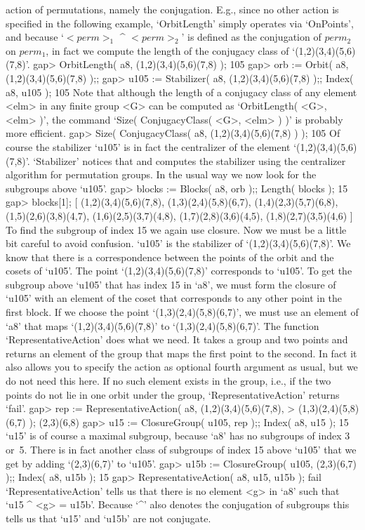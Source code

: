 action of permutations, namely the  conjugation.
E.g., since no  other action is specified  in the  following example,
`OrbitLength' simply operates via `OnPoints',
and because `$<perm>_1$ ^ $<perm>_2$' is defined as the conjugation
of $perm_2$ on $perm_1$, in fact we compute the length of
the conjugacy class of `(1,2)(3,4)(5,6)(7,8)'.
\beginexample
gap> OrbitLength( a8, (1,2)(3,4)(5,6)(7,8) );
105
gap> orb := Orbit( a8, (1,2)(3,4)(5,6)(7,8) );;
gap> u105 := Stabilizer( a8, (1,2)(3,4)(5,6)(7,8) );; Index( a8, u105 );
105 
\endexample
Note that although the length of a conjugacy class of any element <elm>
in any finite group <G> can be computed as `OrbitLength( <G>, <elm> )',
the command `Size( ConjugacyClass( <G>, <elm> ) )' is probably more
efficient.
\beginexample
gap> Size( ConjugacyClass( a8, (1,2)(3,4)(5,6)(7,8) ) );
105
\endexample
Of course the stabilizer `u105' is in fact the centralizer of the element
`(1,2)(3,4)(5,6)(7,8)'.  `Stabilizer' notices    that and computes    the
stabilizer using the centralizer algorithm for permutation groups. In the
usual way we now look for the subgroups above `u105'.
\beginexample
gap> blocks := Blocks( a8, orb );; Length( blocks );
15
gap> blocks[1];
[ (1,2)(3,4)(5,6)(7,8), (1,3)(2,4)(5,8)(6,7), (1,4)(2,3)(5,7)(6,8), 
  (1,5)(2,6)(3,8)(4,7), (1,6)(2,5)(3,7)(4,8), (1,7)(2,8)(3,6)(4,5), 
  (1,8)(2,7)(3,5)(4,6) ]
\endexample
To find the subgroup of index 15 we  again use closure. Now  we must be a
little bit  careful to avoid    confusion. `u105' is the  stabilizer   of
`(1,2)(3,4)(5,6)(7,8)'. We  know  that there is  a correspondence between
the  points  of  the   orbit and  the   cosets  of  `u105'.   The   point
`(1,2)(3,4)(5,6)(7,8)' corresponds   to `u105'.
To get the subgroup above `u105' that has index 15 in `a8',
we must form the closure of `u105' with an element of the coset that
corresponds to any other point in the first block.
If we choose the point `(1,3)(2,4)(5,8)(6,7)',
we must use an element of `a8' that maps `(1,2)(3,4)(5,6)(7,8)' to
`(1,3)(2,4)(5,8)(6,7)'.
The function `RepresentativeAction' does what we need.
It takes a group and two points and returns an element of the group
that maps the first point to the second.
In fact it also allows you to specify the action as optional fourth
argument as usual, but we do not need this here.
If no such element exists in the  group, i.e., if the two points do not
lie in one orbit under the group,
`RepresentativeAction' returns `fail'.
\beginexample
gap> rep := RepresentativeAction( a8, (1,2)(3,4)(5,6)(7,8),
>                                        (1,3)(2,4)(5,8)(6,7) );
(2,3)(6,8)
gap> u15 := ClosureGroup( u105, rep );; Index( a8, u15 );
15 
\endexample
`u15' is of course a maximal  subgroup, because `a8'  has no subgroups of
index 3 or~5.  There is in fact  another  class of subgroups  of index 15
above `u105' that we get by adding `(2,3)(6,7)' to `u105'.
\beginexample
gap> u15b := ClosureGroup( u105, (2,3)(6,7) );; Index( a8, u15b );
15 
gap> RepresentativeAction( a8, u15, u15b );
fail
\endexample
`RepresentativeAction' tells us that  there is no  element <g> in `a8'
such that `u15 ^ <g> = u15b'. Because `^' also denotes the conjugation of
subgroups this tells us  that  `u15' and  `u15b' are not  conjugate.

